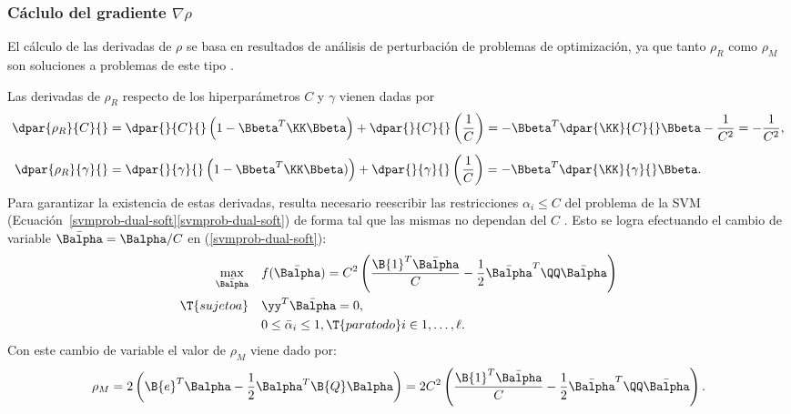 %
\subsubsection{Cáclulo del gradiente $\nabla\rho$}
%
El cálculo de las derivadas de $\rho$ se basa en resultados de
análisis de perturbación de problemas de optimización, ya que tanto
$\rho_R$ como $\rho_M$ son soluciones a problemas de este tipo
\cite{chung}.

Las derivadas de $\rho_R$ respecto de los hiperparámetros $C$ y $\gamma$
vienen dadas por
%
\begin{align}
%
  \dpar{\rho_R}{C}{} &
  = \dpar{}{C}{}\left(1-\Bbeta^T\KK\Bbeta\right)
       + \dpar{}{C}{}\left(\frac{1}{C}\right)
  = -\Bbeta^T \dpar{\KK}{C}{}\Bbeta - \frac{1}{C^2}
  = -\frac{1}{C^2}, \\[1ex]
%
  \dpar{\rho_R}{\gamma}{} &
  = \dpar{}{\gamma}{}\left(1-\Bbeta^T\KK\Bbeta)\right)
       + \dpar{}{\gamma}{}\left(\frac{1}{C}\right)
  = -\Bbeta^T \dpar{\KK}{\gamma}{}\Bbeta.
%
\end{align}
%
Para garantizar la existencia de estas derivadas, resulta necesario
reescribir las restricciones $\alpha_i\leq{}C$ del problema de la SVM
(\iflatexml{}Ecuación~\ref{svmprob-dual-soft}\else\autoref{svmprob-dual-soft}\fi)
de forma tal que las mismas no dependan del \hparam{} $C$
\cite{chung}.
Esto se logra efectuando el cambio de variable
$\bar{\Balpha}=\Balpha/C$ en (\ref{svmprob-dual-soft}):
%
\begin{align}
\begin{split}
    \max_{\bar{\Balpha}}\quad&
    f(\bar{\Balpha}) = C^2 \left( \frac{\B{1}^T\bar{\Balpha}}{C}
    -\frac{1}{2}\bar{\Balpha}^T\QQ\bar{\Balpha}\right)\\
    \T{sujeto a}\quad & \yy^T\bar{\Balpha} = 0, \\
    & 0\leq\bar{\alpha}_i\leq 1,
    \T{ para todo } i\in {1,\ldots,\ell }.
\end{split}
\end{align}
%
Con este cambio de variable el valor de $\rho_M$ viene dado por:
%
\begin{align}
  \label{eq:rmb-alpha-equiv}
  \rho_M=2\left(\B{e}^T\Balpha-\frac{1}{2}\Balpha^T\B{Q}\Balpha\right)
  = 2C^2\left(\frac{\B{1}^T\bar{\Balpha}}{C} -
  \frac{1}{2}\bar{\Balpha}^T\QQ\bar{\Balpha}\right).
\end{align}
%

